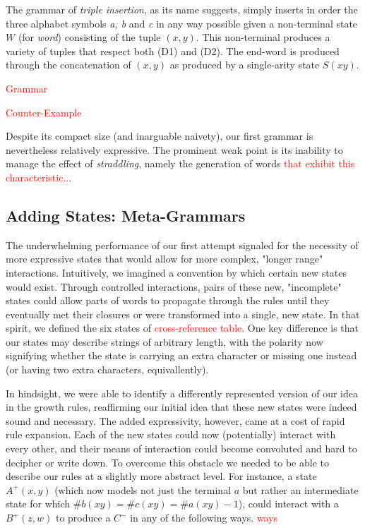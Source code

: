 \documentclass[nonatbib,numbers,10pt]{sigplanconf}
\newcommand\todo[1]{\textcolor{red}{#1}}
\begin{document}
The grammar of \textit{triple insertion}, as its name suggests, simply inserts in order the three alphabet symbols \textit{a, b} and \textit{c} in any way possible given a non-terminal state $W$ (for \textit{word}) consisting of the tuple $(x,y)$. This non-terminal produces a variety of tuples that respect both (D1) and (D2). The end-word is produced through the concatenation of $(x,y)$ as produced by a single-arity state $S(xy)$.

\todo{Grammar}

\todo{Counter-Example}

Despite its compact size (and inarguable naivety), our first grammar is nevertheless relatively expressive. The prominent weak point is its inability to manage the effect of \textit{straddling}, namely the generation of words \todo{that exhibit this characteristic..}.
\subsection{Adding States: Meta-Grammars}
The underwhelming performance of our first attempt signaled for the necessity of more expressive states that would allow for more complex, "longer range" interactions. Intuitively, we imagined a convention by which certain new states would exist. Through controlled interactions, pairs of these new, "incomplete" states could allow parts of words to propagate through the rules until they eventually met their closures or were transformed into a single, new state. In that spirit, we defined the six states of \todo{cross-reference table}. One key difference is that our states may describe strings of arbitrary length, with the polarity now signifying whether the state is carrying an extra character or missing one instead (or having two extra characters, equivallently).

In hindsight, we were able to identify a differently represented version of our idea in the growth rules, reaffirming our initial idea that these new states were indeed sound and necessary. The added expressivity, however, came at a cost of rapid rule expansion. Each of the new states could now (potentially) interact with every other, and their means of interaction could become convoluted and hard to decipher or write down. To overcome this obstacle we needed to be able to describe our rules at a slightly more abstract level. For instance, a state $A^{+}(x,y)$ (which now models not just the terminal $a$ but rather an intermediate state for which $ \# b(xy) = \# c(xy) = \# a(xy)-1$), could interact with a $B^{+}(z,w)$ to produce a $C^{-}$ in any of the following ways.
\todo{ways}
\end{document}

